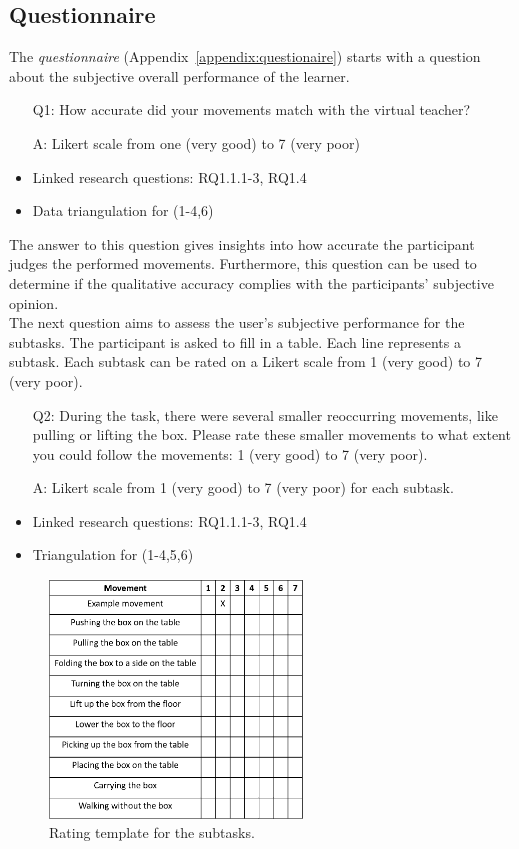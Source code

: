 \subsection{Questionnaire}
The \textit{questionnaire} (Appendix~\ref{appendix:questionaire}) starts with a question about the subjective overall performance of the learner. 
\begin{itemize}
	\item[Q1:] How accurate did your movements match with the virtual teacher?
	\item[A:] Likert scale from one (very good) to 7 (very poor)
	\item Linked research questions: RQ1.1.1-3, RQ1.4
	\item Data triangulation for (1-4,6)
\end{itemize}
The answer to this question gives insights into how accurate the participant judges the performed movements. Furthermore, this question can be used to determine if the qualitative accuracy complies with the participants' subjective opinion.\\
The next question aims to assess the user's subjective performance for the subtasks. The participant is asked to fill in a table. Each line represents a subtask. Each subtask can be rated on a Likert scale from 1 (very good) to 7 (very poor).
\begin{itemize}
	\item[Q2:] During the task, there were several smaller reoccurring movements, like pulling or lifting the box. Please rate these smaller movements to what extent you could follow the movements: 1 (very good) to 7 (very poor).
	\item[A:] Likert scale from 1 (very good) to 7 (very poor) for each subtask.
	\item Linked research questions: RQ1.1.1-3, RQ1.4
	\item Triangulation for (1-4,5,6)
\end{itemize}

\begin{figure}[H]
	\centering
	\includegraphics[width=0.6\textwidth]{figures/sub-task-rating.png}
	\caption[Rating template: subtasks]{Rating template for the subtasks.}
	\label{fig:subtaskrating}
\end{figure}

